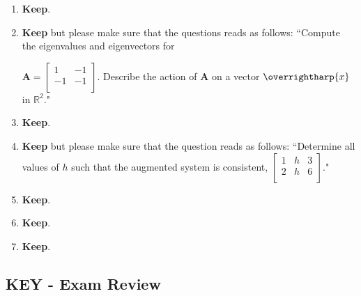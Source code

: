 \documentclass[fleqn]{article}[11pt]
\begin{document}
\begin{enumerate}
	\item \textbf{Keep}.
	
	\item \textbf{Keep} but please make sure that the questions reads as follows: ``Compute the eigenvalues and eigenvectors for 
	
	\(\mathbf{A}=\begin{bmatrix}
	1 & -1 \\
	-1 & -1 \\
  \end{bmatrix}\). Describe the action of $\mathbf{A}$ on a vector $\overrightharp{x}$ in $\mathbb{R}^2$."
  
	\item \textbf{Keep}.
	
	\item \textbf{Keep} but please make sure that the question reads as follows: ``Determine all values of $h$ such that the augmented system is consistent, \(\begin{bmatrix} 1 & h & 3 \\ 
					    2 & h & 6 \\
		    \end{bmatrix}\)."
		    
	\item \textbf{Keep}.
	
	\item \textbf{Keep}.
	
	\item \textbf{Keep}.
\end{enumerate}

\subsection*{\textbf{KEY} - Exam  Review}
\end{document}
